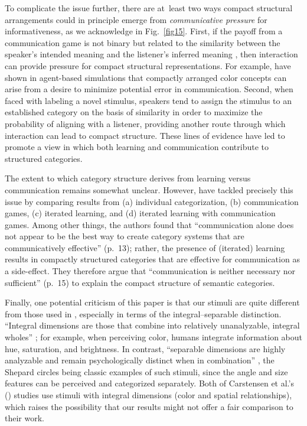 \documentclass[doc,biblatex]{apa7}
\begin{document}
To complicate the issue further, there are at~least two ways compact structural arrangements could in principle emerge from \textit{communicative pressure} for informativeness, as we acknowledge in Fig.~\ref{fig15}. First, if the payoff from a communication game is not binary but related to the similarity between the speaker's intended meaning and the listener's inferred meaning \parencite[see e.g.,][]{Lantz:1964}, then interaction can provide pressure for compact structural representations. For example, \textcite{Jager:2007} have shown in agent-based simulations that compactly arranged color concepts can arise from a desire to minimize potential error in communication. Second, when faced with labeling a novel stimulus, speakers tend to assign the stimulus to an established category on the basis of similarity \parencite[e.g.,][]{Markman:1998} in order to maximize the probability of aligning with a listener, providing another route through which interaction can lead to compact structure. These lines of evidence have led \textcite{Warglien:2011} to promote a view in which both learning and communication contribute to structured categories.

The extent to which category structure derives from learning versus communication remains somewhat unclear. However, \textcite{Silvey:2019} have tackled precisely this issue by comparing results from (a) individual categorization, (b) communication games, (c) iterated learning, and (d) iterated learning with communication games. Among other things, the authors found that ``communication alone does not appear to be the best way to create category systems that are communicatively effective'' (p.~13); rather, the presence of (iterated) learning results in compactly structured categories that are effective for communication as a side-effect. They therefore argue that ``communication is neither necessary nor sufficient'' (p.~15) to explain the compact structure of semantic categories.

Finally, one potential criticism of this paper is that our stimuli are quite different from those used in \textcite{Carstensen:2015}, especially in terms of the integral--separable distinction. ``Integral dimensions are those that combine into relatively unanalyzable, integral wholes'' \parencite[p.~40]{Nosofsky:1986}; for example, when perceiving color, humans integrate information about hue, saturation, and brightness. In contrast, ``separable dimensions are highly analyzable and remain psychologically distinct when in combination'' \parencite[p.~40]{Nosofsky:1986}, the Shepard circles being classic examples of such stimuli, since the angle and size features can be perceived and categorized separately. Both of Carstensen et al.'s (\citeyear{Carstensen:2015}) studies use stimuli with integral dimensions (color and spatial relationships), which raises the possibility that our results might not offer a fair comparison to their work.
\end{document}
